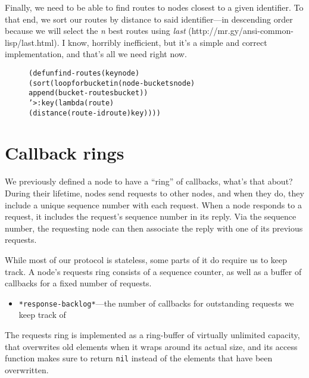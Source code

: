 \documentclass [a4paper,12pt,oneside]{article}\usepackage [paper=a4paper,left=37.5264mm,right=37.5264mm,top=37.5264mm,bottom=37.5264mm]{geometry}\usepackage {graphicx}\usepackage {tabularx}\usepackage {alltt}\usepackage {float}\usepackage [section]{placeins}\usepackage {titling}\setlength {\droptitle }{-4em}\pretitle {\begin {flushright}\bfseries \LARGE }\posttitle {\end {flushright}}\preauthor {\begin {flushright}}\postauthor {\end {flushright}}\predate {\begin {flushright}}\postdate {\end {flushright}}\usepackage [english]{babel}\usepackage [T1]{fontenc}\usepackage [utf8x]{inputenc}\usepackage {stmaryrd}\usepackage {amsfonts}\DeclareUnicodeCharacter {12314}{$\llbracket $}\DeclareUnicodeCharacter {12315}{$\rrbracket $}\DeclareUnicodeCharacter {9655}{$\rhd $}\newcommand \nobreakdash {\mbox {-}}\DeclareUnicodeCharacter {8209}{\nobreakdash }\usepackage [sc]{mathpazo}\linespread {1.05}\usepackage [font={small},labelformat=empty,labelsep=none]{caption}\tolerance=10000 \clubpenalty=10000 \widowpenalty=10000 \frenchspacing
\begin{document}
Finally, we need to be able to find routes to nodes closest to a given identifier. To that end, we sort our routes by distance to said identifier—in descending order because we will select the \textit {n} best routes using \textit {last} (\textsf {http:/\allowbreak /\allowbreak mr.gy/\allowbreak ansi-common-lisp/\allowbreak last.html}). I know, horribly inefficient, but it’s a simple and correct implementation, and that’s all we need right now.

\begin {figure}[H]\centering \begin {alltt}
(defun find-routes (key node)
  (sort (loop for bucket in (node-buckets node)
           append (bucket-routes bucket))
        '> :key (lambda (route)
                  (distance (route-id route) key))))
\end{alltt}\vspace {-1em}\end {figure}



\section* {Callback rings}

We previously defined a node to have a “ring” of callbacks, what’s that about? During their lifetime, nodes send requests to other nodes, and when they do, they include a unique sequence number with each request. When a node responds to a request, it includes the request’s sequence number in its reply. Via the sequence number, the requesting node can then associate the reply with one of its previous requests.

While most of our protocol is stateless, some parts of it do require us to keep track. A node’s requests ring consists of a sequence counter, as well as a buffer of callbacks for a fixed number of requests.

\begin {itemize}\raggedright \item \texttt {*response-backlog*}—the number of callbacks for outstanding requests we keep track of\end {itemize}

The requests ring is implemented as a ring-buffer of virtually unlimited capacity, that overwrites old elements when it wraps around its actual size, and its access function makes sure to return \texttt {nil} instead of the elements that have been overwritten.
\end{document}
